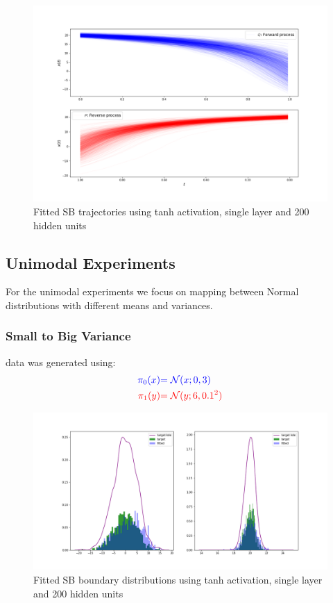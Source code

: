 \documentclass[a4paper,12pt,twoside,openright]{report}
\theoremstyle{definition}
\begin{document}
\begin{figure}
    \centering
    \includegraphics[scale=0.4,trim={2.3cm 1cm 2.5cm 0}, clip]{images/Control/big_var_marginals_best_tanh_trajectories.png}
    \caption{ Fitted SB  trajectories using tanh activation, single layer and 200 hidden units}
    \label{fig:trajectoriesbigvarnn}
\end{figure}
\subsection{Unimodal Experiments}
For the unimodal experiments we focus on mapping between Normal distributions with different means and variances.
\subsubsection{Small to Big Variance}

data was generated using:
\begin{align*}
\color{blue}{\pi_0(x)} &\color{blue}{= {\mathcal{N}}(x; 0,  3)} \\
    \color{red}{\pi_1(y)} &\color{red}{= {\mathcal{N}}(y; 6, 0.1^2)} 
\end{align*}
\begin{figure}
    \centering
    \includegraphics[scale=0.4,trim={2.3cm 1cm 2.5cm 0}, clip]{images/Control/big_variance_tanh_marginals.png}
    \caption{ Fitted SB  boundary distributions using tanh activation, single layer and 200 hidden units}
    \label{fig:boundsbigvarnn}
\end{figure}
\end{document}
